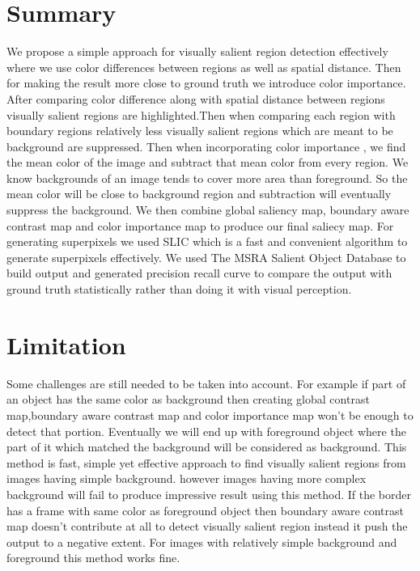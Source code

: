 \section{Summary}
We propose a simple approach for visually salient region detection effectively where we use color differences between regions as well as spatial distance. Then for making the result more close to ground truth we introduce color importance.
After comparing color difference along with spatial distance between regions visually salient regions are highlighted.Then when comparing each region with boundary regions relatively less visually salient regions which are meant to be background are suppressed. Then when incorporating color importance , we find the mean color of the image and subtract that mean color from every region. We know backgrounds of an image tends to cover more area than foreground. So the mean color will be close to background region and subtraction will eventually suppress the background. We then combine global saliency map, boundary aware contrast map and color importance map to produce our final saliecy map. For generating superpixels we used SLIC which is a fast and convenient algorithm to generate superpixels effectively. We used The  MSRA Salient Object Database \cite{cheng2015global}\cite{SalObjSurvey}\cite{SalObjBenchmark}\cite{13iccv/Cheng_Saliency} to build output and generated precision recall curve to compare the output with ground truth statistically rather than doing it with visual perception.
\section{Limitation}
Some challenges are still needed to be taken into account. For example if part of an object has the same color as background then creating global contrast map,boundary aware contrast map and color importance map  won't be enough to detect that portion. Eventually we will end up with foreground object where the part of it which matched the background will be considered as background. This method is fast, simple yet effective approach to find visually salient regions from images
having simple background. however images having more complex background will fail to produce impressive result using this method. If the border has a frame with same color as foreground object then boundary aware contrast map doesn't contribute at all to detect visually salient region instead it push the output to a negative extent. For images with relatively simple background and foreground this method works fine.



